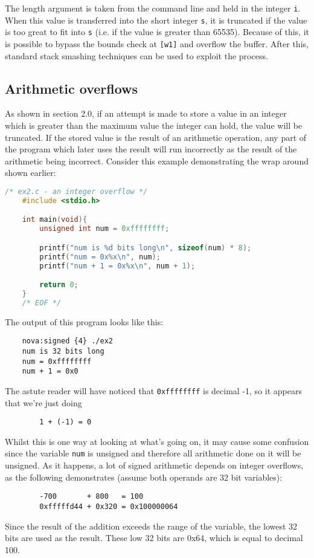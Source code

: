 \documentclass{iacrtrans}
\begin{document}
The length argument is taken from the command line and held in the integer
\texttt{i}.  When this value is transferred into the short integer \texttt{s}, it is
truncated if the value is too great to fit into \texttt{s} (i.e. if the value is
greater than 65535).  Because of this, it is possible to bypass the bounds
check at \texttt{[w1]} and overflow the buffer.  After this, standard stack smashing
techniques can be used to exploit the process.


\subsection{Arithmetic overflows}

As shown in section 2.0, if an attempt is made to store a value in an
integer which is greater than the maximum value the integer can hold, the
value will be truncated.  If the stored value is the result of an
arithmetic operation, any part of the program which later uses the result
will run incorrectly as the result of the arithmetic being incorrect.
Consider this example demonstrating the wrap around shown earlier:

\begin{lstlisting}[language=c]
    /* ex2.c - an integer overflow */
    #include <stdio.h>

    int main(void){
        unsigned int num = 0xffffffff;

        printf("num is %d bits long\n", sizeof(num) * 8);
        printf("num = 0x%x\n", num);
        printf("num + 1 = 0x%x\n", num + 1);

        return 0;
    }
    /* EOF */
\end{lstlisting}

The output of this program looks like this:

\begin{verbatim}
    nova:signed {4} ./ex2
    num is 32 bits long
    num = 0xffffffff
    num + 1 = 0x0
\end{verbatim}

\begin{framed}
    The astute reader will have noticed that \texttt{0xffffffff} is decimal -1, so it
    appears that we're just doing
    \begin{verbatim}
        1 + (-1) = 0
    \end{verbatim}
    Whilst this is one way at looking at what's going on, it may cause some
    confusion since the variable \texttt{num} is unsigned and therefore all arithmetic
    done on it will be unsigned.  As it happens, a lot of signed arithmetic
    depends on integer overflows, as the following demonstrates (assume both
    operands are 32 bit variables):

    \begin{verbatim}
        -700       + 800   = 100
        0xfffffd44 + 0x320 = 0x100000064
    \end{verbatim}

    Since the result of the addition exceeds the range of the variable, the
    lowest 32 bits are used as the result.  These low 32 bits are 0x64, which
    is equal to decimal 100.
\end{framed}
\end{document}
